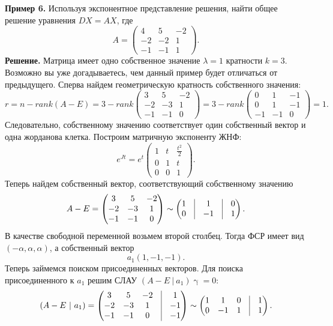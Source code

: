 \documentclass[a4paper, 12pt]{article}
\begin{document}
\textbf{Пример 6.} Используя экспонентное представление решения, найти общее решение уравнения $DX = AX$, где $$A = \begin{pmatrix}
	4 & 5 & -2\\
	-2 & -2 & 1\\
	-1 & -1 & 1
\end{pmatrix}.$$
\textbf{Решение.} Матрица имеет одно собственное значение $\lambda = 1$ кратности $k = 3$. Возможно вы уже догадываетесь, чем данный пример будет отличаться от предыдущего. Сперва найдем геометрическую кратность собственного значения:
$$r = n - rank(A - E)=3 - rank\begin{pmatrix}
	3 & 5 & -2\\
	-2 & -3 & 1\\
	-1 & -1 & 0
\end{pmatrix} = 3 - rank\begin{pmatrix}
0 & 1 & -1\\
0 & 1 & -1\\
-1 & -1 & 0
\end{pmatrix} = 1.$$
Следовательно, собственному значению соответствует один собственный вектор и одна жорданова клетка. Построим матричную экспоненту ЖНФ:
$$e^{Jt} = e^t\begin{pmatrix}
	1 & t & \frac{t^2}{2}\\
	0 & 1 & t\\
	0 & 0 & 1
\end{pmatrix}.$$
Теперь найдем собственный вектор, соответствующий собственному значению $$A - E = \begin{pmatrix}
		3 & 5 & -2\\
	-2 & -3 & 1\\
	-1 & -1 & 0
\end{pmatrix}\sim \begin{pmatrix}
1 & \vline & 1 & \vline & 0\\
0 & \vline & -1 &\vline & 1
\end{pmatrix}.$$
В качестве свободной переменной возьмем второй столбец. Тогда ФСР имеет вид $(-\alpha, \alpha, \alpha)$, а собственный вектор $$a_1(1, -1, -1).$$
Теперь займемся поиском присоединенных векторов. Для поиска присоединенного к $a_1$ решим СЛАУ $(A-E\ |\ a_1)\upgamma = 0$:
$$(A-E\ |\ a_1) = \begin{pmatrix}
	3 & 5 & -2 & \vline & 1\\
	-2 & -3 & 1 & \vline & -1\\
	-1 & -1 & 0 & \vline & -1
\end{pmatrix}\sim \begin{pmatrix}
1 & 1 & 0 & \vline & 1\\
0 & -1 & 1 & \vline & 1\\
\end{pmatrix}.$$
\end{document}
